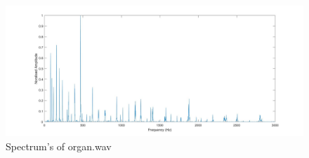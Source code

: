 \documentclass[10.9pt]{article}
\begin{document}
\begin{figure} [H]
\centering	\includegraphics[scale = 0.3]
{Organ_fft}
\caption{Spectrum's of organ.wav}
\label{Organ_fft}
\end{figure}
\end{document}
